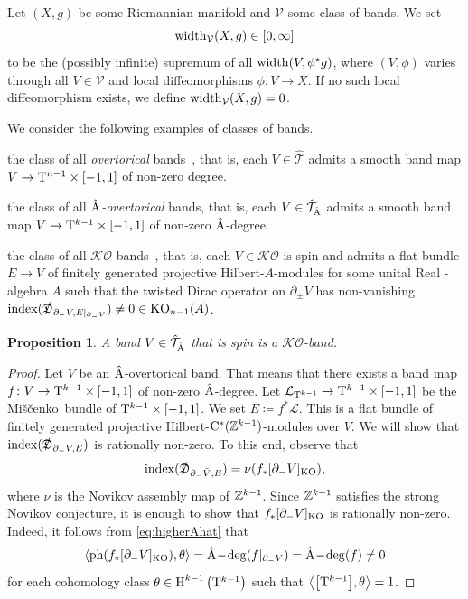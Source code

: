 \documentclass[pdftex]{sigma}
\numberwithin{equation}{section}
\newtheorem{Proposition}[Theorem]{Proposition}
\begin{document}
\begin{Definition} Let \((X,g)\) be some Riemannian manifold and \(\mathcal{V}\) some class of bands.
 We set
 \[\operatorname{width}_{\mathcal{V}}(X, g) \in [0, \infty]\]
 to be the (possibly infinite) supremum of all \( \operatorname{width}(V, \phi^\ast g)\), where \((V, \phi)\) varies through all \(V \in \mathcal{V}\) and local diffeomorphisms \(\phi \colon V \to X\).
 If no such local diffeomorphism exists, we define \(\operatorname{width}_{\mathcal{V}}(X, g) = 0\).
\end{Definition}

We consider the following examples of classes of bands.
\begin{description}\itemsep=0pt
 \item[ \(\hat{\mathcal{T}}\):]the class of all \emph{overtorical} bands~\cite{Gromov:MetricInequalitiesScalar}, that is, each \(V \in \hat{\mathcal{T}}\) admits a smooth band map \(V \to \mathrm{T}^{n-1} \times [-1,1]\) of non-zero degree.
 \item[ \(\hat{\mathcal{T}}_{\Ahat}\):]the class of all \emph{\(\hat{\mathrm{A}}\)-overtorical} bands, that is, each \(V \in \hat{\mathcal{T}}_{{\hat{\mathrm{A}}}}\) admits a smooth band map \(V \to \mathrm{T}^{k-1} \times [-1,1]\) of non-zero \(\hat{\mathrm{A}}\)-degree.
 \item[\(\mathcal{KO}\):] the class of all \(\mathcal{KO}\)-bands~\cite{Zeidler:band-width-estimates}, that is, each \(V \in \mathcal{KO}\) is spin and admits a flat bundle \(E \to V\) of finitely generated projective Hilbert-\(A\)-modules for some unital Real \textCstar-algebra \(A\) such that the twisted Dirac operator on \(\partial_\pm V\) has non-vanishing \(\operatorname{index}(\slashed{\mathfrak{D}}_{\partial_- V, E|_{\partial_- V}}) \neq 0 \in \operatorname{KO}_{n-1}(A)\).
\end{description}

\begin{Proposition} \label{prop:overtorical-implies-KO}
 A band \(V \in \hat{\mathcal{T}}_{\hat{\mathrm{A}}}\) that is spin is a \(\mathcal{KO}\)-band.
\end{Proposition}
\begin{proof}
 Let \(V\) be an \(\hat{\mathrm{A}}\)-overtorical band.
 That means that there exists a band map \(f \colon V \to \mathrm{T}^{k-1} \times [-1,1]\) of non-zero \(\hat{\mathrm{A}}\)-degree.
 Let \(\mathcal{L}_{\mathrm{T}^{k-1}} \to \mathrm{T}^{k-1} \times [-1,1]\) be the Mi\v{s}\v{c}enko\ bundle of \(\mathrm{T}^{k-1} \times [-1,1]\).
 We set \(E \coloneqq f^\ast \mathcal{L}\).
 This is a flat bundle of finitely generated projective Hilbert-\(\mathrm{C}^\ast(\mathbb{Z}^{k-1})\)-modules over \(V\).
 We will show that \(\operatorname{index}(\slashed{\mathfrak{D}}_{\partial_- V, E})\) is rationally non-zero.
 To this end, observe that
 \[
 \operatorname{index}(\slashed{\mathfrak{D}}_{\partial_- \bar{V}, E}) = \nu(f_\ast [\partial_- V]_{\operatorname{KO}}),
 \]
 where \(\nu\) is the Novikov assembly map of \(\mathbb{Z}^{k-1}\).
 Since \(\mathbb{Z}^{k-1}\) satisfies the strong Novikov conjecture, it is enough to show that
 \(f_\ast [\partial_- V]_{\operatorname{KO}}\) is rationally non-zero.
 Indeed, it follows from \eqref{eq:higherAhat} that
 \[
 \langle \operatorname{ph}(f_\ast [\partial_- V]_{\operatorname{KO}}), \theta \rangle = \hat{\mathrm{A}}\!-\!\deg(f|_{\partial_- V}) = \hat{\mathrm{A}}\!-\!\deg(f) \neq 0
 \]
 for each cohomology class \(\theta \in \operatorname{H}^{k-1}\big(\mathrm{T}^{k-1}\big)\) such that \(\big\langle \big[\mathrm{T}^{k-1}\big], \theta \big\rangle = 1\).
\end{proof}
\end{document}
